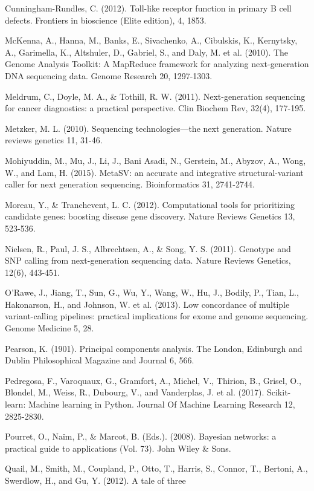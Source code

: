 \documentclass{article}
\begin{document}
\begin{list}{}{%
\setlength{\topsep}{0pt}%
\setlength{\leftmargin}{0.5in}%
\setlength{\listparindent}{-0.5in}%
\setlength{\itemindent}{-0.5in}%
\setlength{\parsep}{\parskip}%
}
Cunningham-Rundles, C. (2012). Toll-like receptor function in primary B cell defects. Frontiers in bioscience (Elite edition), 4, 1853.\\\item[] McKenna, A., Hanna, M., Banks, E., Sivachenko, A., Cibulskis, K., Kernytsky, A., Garimella, K., Altshuler, D., Gabriel, S., and Daly, M. et al. (2010). The Genome Analysis Toolkit: A MapReduce framework for analyzing next-generation DNA sequencing data. Genome Research 20, 1297-1303.\\\item[] Meldrum, C., Doyle, M. A., \& Tothill, R. W. (2011). Next-generation sequencing for cancer diagnostics: a practical perspective. Clin Biochem Rev, 32(4), 177-195.\\\item[] Metzker, M. L. (2010). Sequencing technologies—the next generation. Nature reviews genetics 11, 31-46.\\\item[] Mohiyuddin, M., Mu, J., Li, J., Bani Asadi, N., Gerstein, M., Abyzov, A., Wong, W., and Lam, H. (2015). MetaSV: an accurate and integrative structural-variant caller for next generation sequencing. Bioinformatics 31, 2741-2744.\\\item[] Moreau, Y., \& Tranchevent, L. C. (2012). Computational tools for prioritizing candidate genes: boosting disease gene discovery. Nature Reviews Genetics 13, 523-536.\\\item[] Nielsen, R., Paul, J. S., Albrechtsen, A., \& Song, Y. S. (2011). Genotype and SNP calling from next-generation sequencing data. Nature Reviews Genetics, 12(6), 443-451.\\\item[] O'Rawe, J., Jiang, T., Sun, G., Wu, Y., Wang, W., Hu, J., Bodily, P., Tian, L., Hakonarson, H., and Johnson, W. et al. (2013). Low concordance of multiple variant-calling pipelines: practical implications for exome and genome sequencing. Genome Medicine 5, 28.\\\item[] Pearson, K. (1901). Principal components analysis. The London, Edinburgh and Dublin Philosophical Magazine and Journal 6, 566.\\\item[] Pedregosa, F., Varoquaux, G., Gramfort, A., Michel, V., Thirion, B., Grisel, O., Blondel, M., Weiss, R., Dubourg, V., and Vanderplas, J. et al. (2017). Scikit-learn: Machine learning in Python. Journal Of Machine Learning Research 12, 2825-2830.\\\item[] Pourret, O., Naïm, P., \& Marcot, B. (Eds.). (2008). Bayesian networks: a practical guide to applications (Vol. 73). John Wiley \& Sons.\\\item[] Quail, M., Smith, M., Coupland, P., Otto, T., Harris, S., Connor, T., Bertoni, A., Swerdlow, H., and Gu, Y. (2012). A tale of three 
\end{list}
\end{document}
